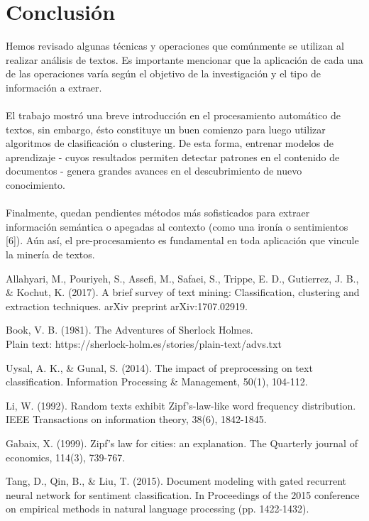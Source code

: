 \documentclass[conference]{IEEEtran}
\begin{document}
\section{Conclusión}
Hemos revisado algunas técnicas y operaciones que comúnmente se utilizan al realizar análisis de textos. Es importante mencionar que la aplicación de cada una de las operaciones varía según el objetivo de la investigación y el tipo de información a extraer.\\\\El trabajo mostró una breve introducción en el procesamiento automático de textos, sin embargo, ésto constituye un buen comienzo para luego utilizar algoritmos de clasificación o clustering. De esta forma, entrenar modelos de aprendizaje - cuyos resultados permiten detectar patrones en el contenido de documentos - genera grandes avances en el descubrimiento de nuevo conocimiento.\\\\Finalmente, quedan pendientes métodos más sofisticados para extraer información semántica o apegadas al contexto (como una ironía o sentimientos [6]). Aún así, el pre-procesamiento es fundamental en toda aplicación que vincule la minería de textos.  
\begin{thebibliography}{1}

Allahyari, M., Pouriyeh, S., Assefi, M., Safaei, S., Trippe, E. D., Gutierrez, J. B., \& Kochut, K. (2017). A brief survey of text mining: Classification, clustering and extraction techniques. arXiv preprint arXiv:1707.02919.

Book, V. B. (1981). The Adventures of Sherlock Holmes. \\Plain text: https://sherlock-holm.es/stories/plain-text/advs.txt

Uysal, A. K., \& Gunal, S. (2014). The impact of preprocessing on text classification. Information Processing \& Management, 50(1), 104-112.

Li, W. (1992). Random texts exhibit Zipf's-law-like word frequency distribution. IEEE Transactions on information theory, 38(6), 1842-1845.

Gabaix, X. (1999). Zipf's law for cities: an explanation. The Quarterly journal of economics, 114(3), 739-767.

Tang, D., Qin, B., \& Liu, T. (2015). Document modeling with gated recurrent neural network for sentiment classification. In Proceedings of the 2015 conference on empirical methods in natural language processing (pp. 1422-1432).
\end{thebibliography}




\end{document}
